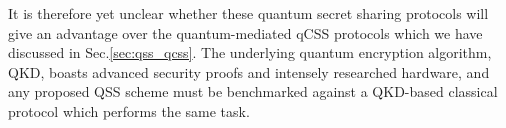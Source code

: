 It is therefore yet unclear whether these quantum secret sharing protocols will give an advantage over the quantum-mediated qCSS protocols which we have discussed in Sec.\ref{sec:qss_qcss}. The underlying quantum encryption algorithm, QKD, boasts advanced security proofs and intensely researched hardware, and any proposed QSS scheme must be benchmarked against a QKD-based classical protocol which performs the same task.
